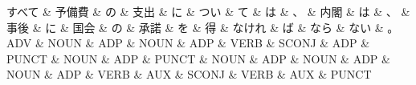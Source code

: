 \documentclass[tikz,border=5pt]{standalone}
\begin{document}
\normalsize
\begin{dependency}[edge unit distance=12.0pt]
    \begin{deptext}[column sep=1em]
        すべて \& 予備費 \& の \& 支出 \& に \& つい \& て \& は \& 、 \& 内閣 \& は \& 、 \& 事後 \& に \& 国会 \& の \& 承諾 \& を \& 得 \& なけれ \& ば \& なら \& ない \& 。\\
        ADV \& NOUN \& ADP \& NOUN \& ADP \& VERB \& SCONJ \& ADP \& PUNCT \& NOUN \& ADP \& PUNCT \& NOUN \& ADP \& NOUN \& ADP \& NOUN \& ADP \& VERB \& AUX \& SCONJ \& VERB \& AUX \& PUNCT\\
    \end{deptext}
\end{dependency}
\end{document}
